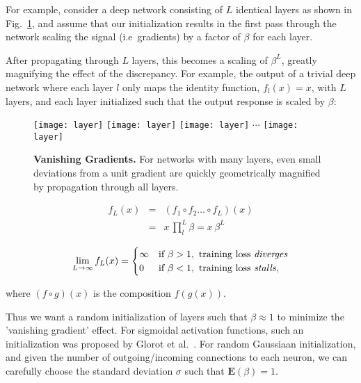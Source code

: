 \documentclass[thesis]{subfiles}
\begin{document}
For example, consider a deep network consisting of $L$ identical layers as shown in Fig.~\ref{fig:manylayers}, and assume that our initialization results in the first pass through the network scaling the signal (i.e~gradients) by a factor of $\beta$ for each layer.

After propagating through $L$ layers, this becomes a scaling of $\beta^L$, greatly magnifying the effect of the discrepancy. For example, the output of a trivial deep network  where each layer $l$ only maps the identity function, $f_{l}(x) = x$, with $L$ layers, and each layer initialized such that the output response is scaled by $\beta$:

\begin{figure}[tp]
	\texttt{[image: layer]}
	\texttt{[image: layer]}
	\texttt{[image: layer]}
	$\cdots$
	\texttt{[image: layer]}
	\caption{\textbf{Vanishing Gradients.} For networks with many layers, even small deviations from a unit gradient are quickly geometrically magnified by propagation through all layers.}
	\label{fig:manylayers}
\end{figure}

\begin{eqnarray*}
	f_L(x) & = & (f_1 \circ f_2 \ldots \circ f_L) (x)\\
	& = & x \, \prod^{L}_{l} \beta = x\, \beta^L
\end{eqnarray*}

\[
\lim_{L\to\infty} f_L(x) = 
\begin{cases}
\infty & \text{if } \beta > 1, \text{ training loss \emph{diverges}}\\
0 & \text{if } \beta < 1, \text{ training loss \emph{stalls}},
\end{cases}
\]

where $(f \circ g)(x)$ is the composition $f(g(x))$.

Thus we want a random initialization of layers such that $\beta\approx 1$ to minimize the 'vanishing gradient' effect. For sigmoidal activation functions, such an initialization was proposed by Glorot et al.~\cite{glorot2010understanding}. For random Gaussiaan initialization, and given the number of outgoing/incoming connections to each neuron, we can carefully choose the standard deviation $\sigma$ such that $\mathbf{E}(\beta) = 1$. 
\end{document}
